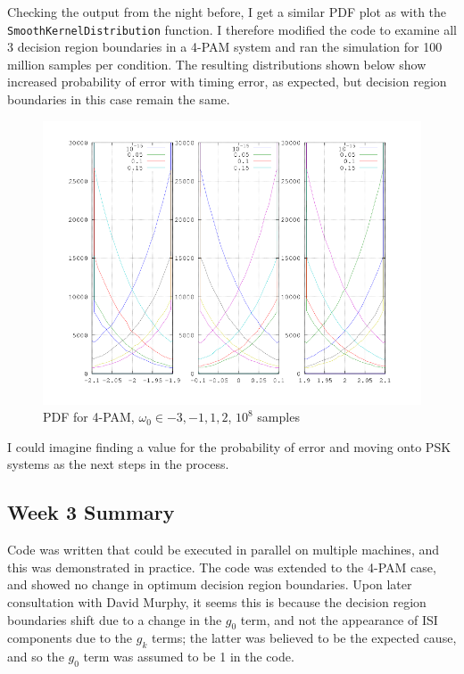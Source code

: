 Checking the output from the night before, I get a similar PDF plot as
with the \texttt{SmoothKernelDistribution} function. I therefore
modified the code to examine all 3 decision region boundaries in a 4-PAM
system and ran the simulation for 100 million samples per condition. The
resulting distributions shown below show increased probability of error
with timing error, as expected, but decision region boundaries in this
case remain the same.

\begin{figure}[htbp]
\centering
\includegraphics[width=\linewidth]{../../../plots/4pamdecision.png}
\caption[(Incorrect) non-fading received symbol PDF]{PDF for 4-PAM, $\omega_0 \in {-3,-1,1,2}$, $10^8$ samples}
\end{figure}

I could imagine finding a value for the probability of error and moving
onto PSK systems as the next steps in the process.

\subsection{Week 3 Summary}

Code was written that could be executed in parallel on multiple
machines, and this was demonstrated in practice. The code was extended
to the 4-PAM case, and showed no change in optimum decision region
boundaries. Upon later consultation with David Murphy, it seems this is because
the decision region boundaries shift due to a change in the $g_0$ term,
and not the appearance of ISI components due to the $g_k$ terms; the
latter was believed to be the expected cause, and so the $g_0$ term was
assumed to be 1 in the code.


